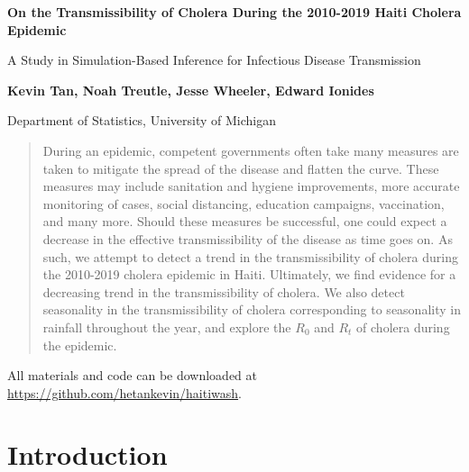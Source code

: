 \documentclass[12pt]{article}
\date{This manuscript was compiled on \today}
\begin{document}


\def\spacingset#1{\renewcommand{\baselinestretch}%
{#1}\small\normalsize} \spacingset{1}

\thispagestyle{plain}
\begin{center}
    \Large
    \textbf{On the Transmissibility of Cholera During the 2010-2019 Haiti Cholera Epidemic}
        
    \vspace{0.1cm}
    \large
    A Study in Simulation-Based Inference for Infectious Disease Transmission
        
    \vspace{0.4cm}
    \textbf{Kevin Tan, Noah Treutle, Jesse Wheeler, Edward Ionides}
    
    \vspace{0.2cm}
    Department of Statistics, University of Michigan
       
    \vspace{0.9cm}
\end{center}

\begin{abstract}
During an epidemic, competent governments often take many measures are taken to mitigate the spread of the disease and flatten the curve. 
These measures may include sanitation and hygiene improvements, more accurate monitoring of cases, social distancing, education campaigns, vaccination, and many more. 
Should these measures be successful, one could expect a decrease in the effective transmissibility of the disease as time goes on. 
As such, we attempt to detect a trend in the transmissibility of cholera during the 2010-2019 cholera epidemic in Haiti. 
Ultimately, we find evidence for a decreasing trend in the transmissibility of cholera. 
We also detect seasonality in the transmissibility of cholera corresponding to seasonality in rainfall throughout the year, and explore the $R_0$ and $R_t$ of cholera during the epidemic. 
\end{abstract}

\vfill

\noindent All materials and code can be downloaded at \url{https://github.com/hetankevin/haitiwash}.

\newpage

\spacingset{1.25} %

\section{Introduction}
\end{document}
